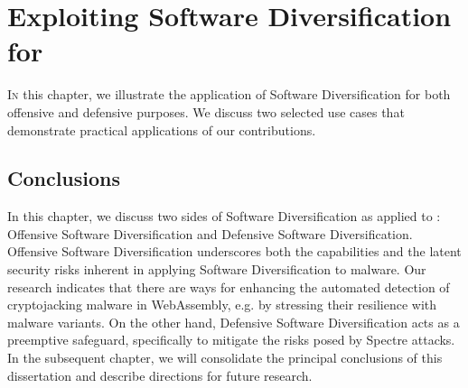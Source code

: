 \chapter{Exploiting Software Diversification for \Wasm}
\label{exploit}
\lettrine[lines=3]{I}{n} this chapter, we illustrate the application of Software Diversification for both offensive and defensive purposes.
We discuss two selected use cases that demonstrate practical applications of our contributions.








% 

\section*{Conclusions}

In this chapter, we discuss two sides of Software Diversification as applied to \Wasm: Offensive Software Diversification and Defensive Software Diversification.
Offensive Software Diversification underscores both the capabilities and the latent security risks inherent in applying Software Diversification to \Wasm malware.
Our research indicates that there are ways for enhancing the automated detection of cryptojacking malware in WebAssembly, e.g. by stressing their resilience with \Wasm malware variants.
On the other hand, Defensive Software Diversification acts as a preemptive safeguard, specifically to mitigate the risks posed by Spectre attacks.
In the subsequent chapter, we will consolidate the principal conclusions of this dissertation and describe directions for future research.